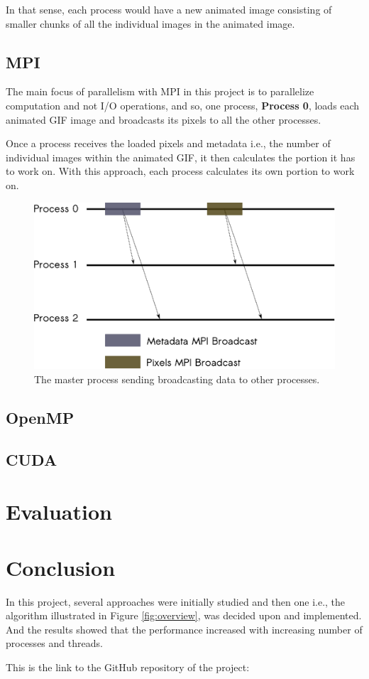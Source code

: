 \documentclass[11pt]{article}
\begin{document}
In that sense, each process would have a new animated image consisting of smaller chunks of all the individual images in the animated image.

\subsection{MPI}

The main focus of parallelism with MPI in this project is to parallelize computation and not I/O operations, and so, one process, \textbf{Process 0}, loads each animated GIF image and broadcasts its pixels to all the other processes.

Once a process receives the loaded pixels and metadata i.e., the number of individual images within the animated GIF, it then calculates the portion it has to work on. With this approach, each process calculates its own portion to work on.

\begin{figure}[h!]
	\centering
	\includegraphics[scale=0.6]{MPI_Bcast.eps}
	\caption{The master process sending broadcasting data to other processes.}
\end{figure}
\subsection{OpenMP}
\subsection{CUDA}
\section{Evaluation}
\section{Conclusion}

In this project, several approaches were initially studied and then one i.e., the algorithm illustrated in Figure \ref{fig:overview}, was decided upon and implemented. And the results showed that the performance increased with increasing number of processes and threads.

This is the link to the GitHub repository of the project: 
\end{document}
